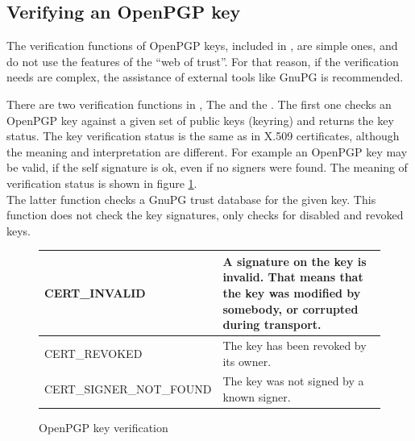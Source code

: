 \subsection*{Verifying an OpenPGP key}
The verification functions of OpenPGP keys, included in \gnutls{}, 
are simple ones, and do not use the features of the ``web of trust''.
For that reason, if the verification needs are complex, 
the assistance of external tools like GnuPG is recommended.
\par
There are two verification functions in \gnutls{},
The 
and the . 
The first one checks an OpenPGP key against a given set of public keys (keyring) and
returns the key status. The key verification status is the same as in X.509 certificates,
although the meaning and interpretation are different. For example an OpenPGP key may
be valid, if the self signature is ok, even if no signers were found.
The meaning of verification status is shown in figure \ref{fig:pgp_verify}.
\\
The latter function checks a GnuPG trust database for the given key. This function does not
check the key signatures, only checks for disabled and revoked keys.

\begin{figure}[hbtp]
\begin{tabular}{|l|p{7cm}|}

\hline
CERT\_INVALID & A signature on the key is invalid. That means that the key was modified
by somebody, or corrupted during transport.
\\
\hline
CERT\_REVOKED & The key has been revoked by its owner.
\\
\hline
CERT\_SIGNER\_NOT\_FOUND & The key was not signed by a known signer.
\\
\hline
\end{tabular}
\caption{OpenPGP key verification}
\label{fig:pgp_verify}
\end{figure}

